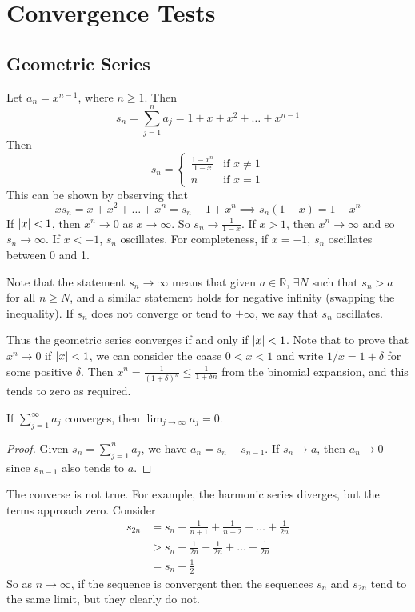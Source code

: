 \documentclass{article}
\begin{document}
\section{Convergence Tests}
\subsection{Geometric Series}
Let $a_n = x^{n-1}$, where $n \geq 1$. Then
\[ s_n = \sum_{j=1}^n a_j = 1 + x + x^2 + \dots + x^{n-1} \]
Then
\[ s_n = \begin{cases}
		\frac{1 - x^n}{1 - x} & \text{if } x \neq 1 \\
		n                     & \text{if } x = 1
	\end{cases} \]
This can be shown by observing that
\[ x s_n = x + x^2 + \dots + x^n = s_n - 1 + x^n \implies s_n(1-x) = 1-x^n \]
If $\abs{x} < 1$, then $x^n \to 0$ as $x \to \infty$. So $s_n \to \frac{1}{1-x}$. If $x > 1$, then $x^n \to \infty$ and so $s_n \to \infty$. If $x < -1$, $s_n$ oscillates. For completeness, if $x=-1$, $s_n$ oscillates between 0 and 1.

Note that the statement $s_n \to \infty$ means that given $a \in \mathbb R$, $\exists N$ such that $s_n > a$ for all $n \geq N$, and a similar statement holds for negative infinity (swapping the inequality). If $s_n$ does not converge or tend to $\pm \infty$, we say that $s_n$ oscillates.

Thus the geometric series converges if and only if $\abs{x} < 1$. Note that to prove that $x^n \to 0$ if $\abs{x} < 1$, we can consider the caase $0 < x < 1$ and write $1/x = 1 + \delta$ for some positive $\delta$. Then $x^n = \frac{1}{(1 + \delta)^n} \leq \frac{1}{1 + \delta n}$ from the binomial expansion, and this tends to zero as required.

\begin{lemma}
	If $\sum_{j=1}^\infty a_j$ converges, then $\lim_{j \to \infty} a_j = 0$.
\end{lemma}
\begin{proof}
	Given $s_n = \sum_{j=1}^n a_j$, we have $a_n = s_n - s_{n-1}$. If $s_n \to a$, then $a_n \to 0$ since $s_{n-1}$ also tends to $a$.
\end{proof}
\begin{remark}
	The converse is not true. For example, the harmonic series diverges, but the terms approach zero. Consider
	\begin{align*}
		s_{2n} & = s_n + \frac{1}{n+1} + \frac{1}{n+2} + \dots + \frac{1}{2n} \\
		       & > s_n + \frac{1}{2n} + \frac{1}{2n} + \dots + \frac{1}{2n}   \\
		       & = s_n + \frac{1}{2}
	\end{align*}
	So as $n \to \infty$, if the sequence is convergent then the sequences $s_n$ and $s_{2n}$ tend to the same limit, but they clearly do not.
\end{remark}
\end{document}
